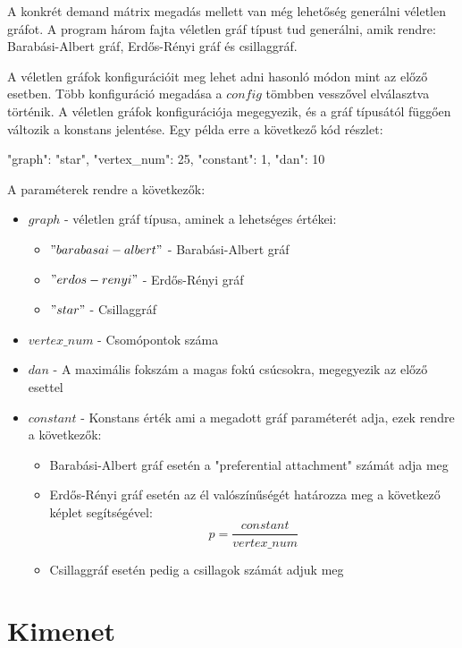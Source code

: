 \documentclass[12pt]{report}
\begin{document}
A konkrét demand mátrix megadás mellett van még lehetőség generálni véletlen gráfot.
A program három fajta véletlen gráf típust tud generálni, amik rendre: Barabási-Albert gráf, Erdős-Rényi gráf és csillaggráf.

A véletlen gráfok konfigurációit meg lehet adni hasonló módon mint az előző esetben.
Több konfiguráció megadása a $config$ tömbben vesszővel elválasztva történik.
A véletlen gráfok konfigurációja megegyezik, és a gráf típusától függően változik a konstans jelentése. 
Egy példa erre a következő kód részlet:

\pagebreak

\begin{mintedJson}
{
	"graph": "star",
	"vertex_num": 25,
	"constant": 1,
	"dan": 10
}
\end{mintedJson}


A paraméterek rendre a következők:

\begin{itemize}
	\item $graph$ - véletlen gráf típusa, aminek a lehetséges értékei:
	\begin{itemize}
		\item $"barabasai-albert"$ - Barabási-Albert gráf
		\item $"erdos-renyi"$ - Erdős-Rényi gráf
		\item $"star"$ - Csillaggráf
	\end{itemize}
	
	\item $vertex\_num$ - Csomópontok száma
	\item $dan$ - A maximális fokszám a magas fokú csúcsokra, megegyezik az előző esettel
	\item $constant$ - Konstans érték ami a megadott gráf paraméterét adja, ezek rendre a következők:
	\begin{itemize}
		\item Barabási-Albert gráf esetén a "preferential attachment" számát adja meg
		\item Erdős-Rényi gráf esetén az él valószínűségét határozza meg a következő képlet segítségével:  \[p = \frac{constant}{vertex\_num}\]
		\item Csillaggráf esetén pedig a csillagok számát adjuk meg
	\end{itemize}
\end{itemize}


\section{Kimenet}
\end{document}
